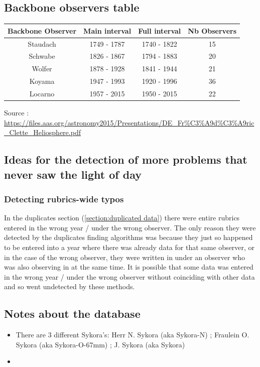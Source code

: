 \documentclass[12pt]{article}
\begin{document}
\subsection{Backbone observers table}

{\centering
\begin{tabular}{c|c|c|c}\label{table:backbone}
     Backbone Observer & Main interval & Full interval & Nb Observers  \\
     \hline
     Staudach & 1749 - 1787 & 1740 - 1822 & 15 \\
     Schwabe & 1826 - 1867 & 1794 - 1883 & 20 \\
     Wolfer & 1878 - 1928 & 1841 - 1944 & 21 \\
     Koyama & 1947 - 1993 & 1920 - 1996 & 36 \\
     Locarno & 1957 - 2015 & 1950 - 2015 & 22 \\
\end{tabular}
\par}
\footnotesize{Source : \href{https://files.aas.org/astronomy2015/Presentations/DE_Fr\%C3\%A9d\%C3\%A9ric_Clette_Heliosphere.pdf}{https://files.aas.org/astronomy2015/Presentations/DE_Fr\%C3\%A9d\%C3\%A9ric_Clette_Heliosphere.pdf}}

\subsection{Ideas for the detection of more problems that never saw the light of day}
\subsubsection{Detecting rubrics-wide typos}
In the duplicates section (\ref{section:duplicated data}) there were entire rubrics entered in the wrong year / under the wrong observer. The only reason they were detected by the duplicates finding algorithms was because they just so happened to be entered into a year where there was already data for that same observer, or in the case of the wrong observer, they were written in under an observer who was also observing in at the same time. It is possible that some data was entered in the wrong year / under the wrong observer without coinciding with other data and so went undetected by these methods.\\



\subsection{Notes about the database}
\begin{itemize}
    \item There are 3 different Sykora's: Herr N. Sykora (aka Sykora-N) ; Fraulein O. Sykora (aka Sykora-O-67mm) ; J. Sykora (aka Sykora)\label{section:info sykora}
    \item 
\end{itemize}
\end{document}
